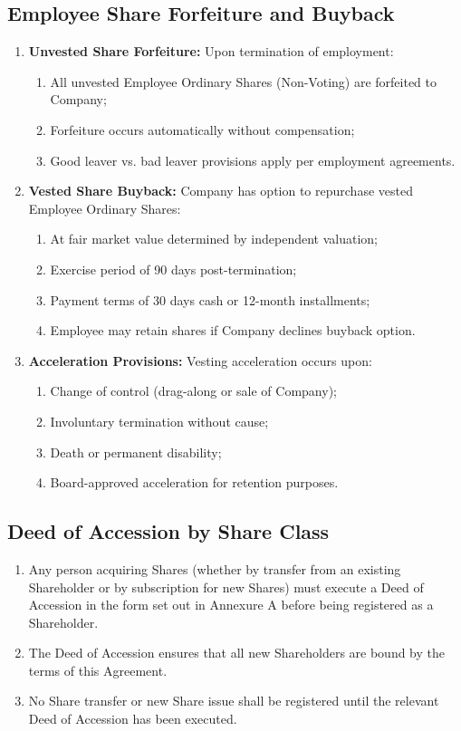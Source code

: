 \subsection{Employee Share Forfeiture and Buyback}
\begin{enumerate}[label=(\alph*)]
\item \textbf{Unvested Share Forfeiture:} Upon termination of employment:
    \begin{enumerate}[label=(\roman*)]
    \item All unvested Employee Ordinary Shares (Non-Voting) are forfeited to Company;
    \item Forfeiture occurs automatically without compensation;
    \item Good leaver vs. bad leaver provisions apply per employment agreements.
    \end{enumerate}
\item \textbf{Vested Share Buyback:} Company has option to repurchase vested Employee Ordinary Shares:
    \begin{enumerate}[label=(\roman*)]
    \item At fair market value determined by independent valuation;
    \item Exercise period of 90 days post-termination;
    \item Payment terms of 30 days cash or 12-month installments;
    \item Employee may retain shares if Company declines buyback option.
        \end{enumerate}
\item \textbf{Acceleration Provisions:} Vesting acceleration occurs upon:
    \begin{enumerate}[label=(\roman*)]
    \item Change of control (drag-along or sale of Company);
    \item Involuntary termination without cause;
    \item Death or permanent disability;
    \item Board-approved acceleration for retention purposes.
    \end{enumerate}
\end{enumerate}

\subsection{Deed of Accession by Share Class} \label{subsec:DeedOfAccession}
\begin{enumerate}[label=(\alph*)]
\item Any person acquiring Shares (whether by transfer from an existing Shareholder or by subscription for new Shares) must execute a Deed of Accession in the form set out in Annexure A before being registered as a Shareholder.
\item The Deed of Accession ensures that all new Shareholders are bound by the terms of this Agreement.
\item No Share transfer or new Share issue shall be registered until the relevant Deed of Accession has been executed.
\end{enumerate}

